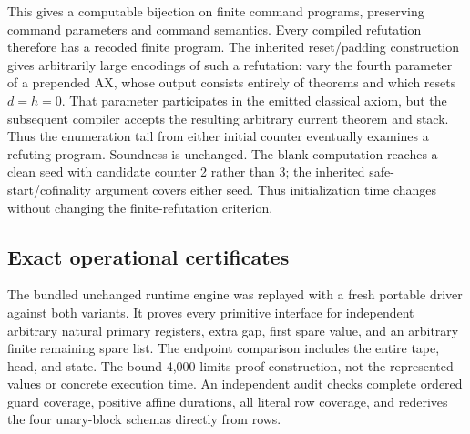 \documentclass[11pt]{article}
\begin{document}
This gives a computable bijection on finite command programs, preserving
command parameters and command semantics. Every compiled refutation therefore
has a recoded finite program. The inherited reset/padding construction gives
arbitrarily large encodings of such a refutation: vary the fourth parameter
of a prepended AX, whose output consists entirely of theorems and which resets
$d=h=0$. That parameter participates in the emitted classical axiom, but the
subsequent compiler accepts the resulting arbitrary current theorem and stack.
Thus the enumeration tail from either initial counter eventually examines a
refuting program. Soundness is unchanged. The blank computation reaches a clean seed with
candidate counter 2 rather than 3; the inherited safe-start/cofinality argument
covers either seed. Thus initialization time changes without changing the
finite-refutation criterion.

\subsection{Exact operational certificates}
The bundled unchanged runtime engine was replayed with a fresh portable driver
against both variants. It proves every primitive interface for independent
arbitrary natural primary registers, extra gap, first spare value, and an
arbitrary finite remaining spare list. The endpoint comparison includes the
entire tape, head, and state. The bound 4,000 limits proof construction, not
the represented values or concrete execution time. An independent audit
checks complete ordered guard coverage, positive affine durations, all literal
row coverage, and rederives the four unary-block schemas directly from rows.
\end{document}
